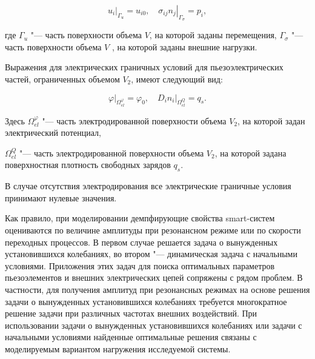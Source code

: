 \begin{equation}\label{mult:eq5}

 \left. u_{i} \right|_{\Gamma_{u}}=u_{i0},

\quad  \left. \sigma_{ij}n_{j} \right|_{\Gamma_{\sigma}}=p_{i},

\end{equation}

где  $\Gamma_{u}$ "--- часть поверхности объема $V$, на которой заданы перемещения, $\Gamma_{\sigma}$ "--- часть поверхности объема $V$ , на которой заданы внешние нагрузки.

Выражения для электрических граничных условий для пьезоэлектрических частей, ограниченных объемом $V_{2}$, имеют следующий вид:

\begin{equation}\label{mult:eq6}

\left. \varphi \right|_{\Omega_{el}^{\varphi}}=\varphi_{0},

\quad \left. D_{i}n_{i} \right|_{\Omega_{el}^{Q}}=q_{s}.	

\end{equation}

Здесь $\Omega_{el}^{\varphi}$ "--- часть электродированной поверхности объема $V_{2}$, на которой задан электрический потенциал,

$\Omega_{el}^{Q}$ "--- часть электродированной поверхности объема $V_{2}$, на которой задана поверхностная плотность свободных зарядов $q_{s}$.

В случае отсутствия электродирования все электрические граничные условия принимают нулевые значения.



\smallskip




Как правило, при моделировании демпфирующие свойства smart-систем оцениваются по величине амплитуды при резонансном режиме или по скорости переходных процессов. В первом случае решается задача о вынужденных установившихся колебаниях, во втором "--- динамическая задача с начальными условиями. Приложения этих задач для поиска оптимальных параметров пьезоэлементов и внешних электрических цепей сопряжены с рядом проблем. В частности, для получения амплитуд при резонансных режимах на основе решения задачи о вынужденных установившихся колебаниях требуется многократное решение задачи при различных частотах внешних воздействий. При использовании задачи о вынужденных установившихся колебаниях или задачи с начальными условиями найденные оптимальные решения связаны с моделируемым вариантом нагружения исследуемой системы.




